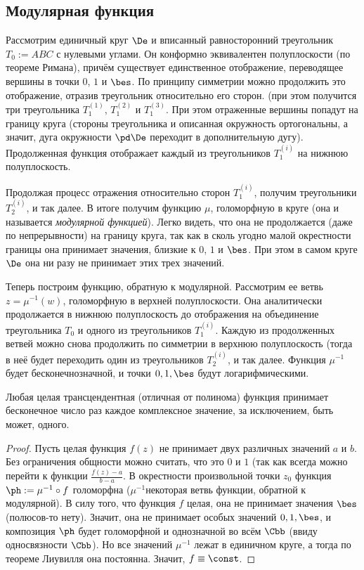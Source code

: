 \documentclass[a4paper]{article}
\begin{document}
\begin{theorem}
\subsection{Модулярная функция}

Рассмотрим единичный круг $\De$ и вписанный равносторонний треугольник $T_0 := ABC$ с нулевыми углами. Он конформно
эквивалентен полуплоскости (по теореме Римана), причём существует единственное отображение,  переводящее вершины
в точки $0$, $1$ и $\bes$. По принципу симметрии можно продолжить это отображение, отразив треугольник относительно
его сторон. (при этом получится три треугольника $T_1^{(1)}$, $T_1^{(2)}$ и $T_1^{(3)}$.
При этом отраженные вершины попадут на границу круга (стороны треугольника и описанная окружность ортогональны,
а значит, дуга окружности $\pd \De$ переходит в дополнительную дугу). Продолженная функция отображает каждый из
треугольников $T_1^{(i)}$ на нижнюю полуплоскость.

Продолжая процесс отражения относительно сторон $T_1^{(i)}$, получим треугольники $T_2^{(i)}$, и так далее.
В итоге получим функцию $\mu$, голоморфную в круге (она и называется \emph{модулярной функцией}). Легко видеть, что
она не продолжается (даже по непрерывности) на границу круга, так как в сколь угодно малой окрестности границы она
принимает значения, близкие к $0$, $1$ и $\bes$. При этом в самом круге $\De$ она ни разу не принимает этих трех значений.

Теперь построим  функцию, обратную к модулярной. Рассмотрим ее ветвь $z = \mu^{-1}(w)$, голоморфную в верхней полуплоскости.
Она аналитически продолжается в нижнюю полуплоскость до отображения на объединение треугольника $T_0$ и одного из
треугольников $T_1^{(i)}$. Каждую из продолженных ветвей можно снова продолжить по симметрии в верхнюю полуплоскость
(тогда в неё будет переходить один из треугольников $T_2^{(i)}$, и так далее. Функция $\mu^{-1}$ будет бесконечнозначной,
и точки $0,1,\bes$ будут логарифмическими.

\begin{theorem}
Любая целая трансцендентная ( отличная от полинома) функция принимает бесконечное число раз каждое
комплексное значение, за исключением, быть может, одного.
\end{theorem}
\begin{proof}
Пусть целая функция $f(z)$ не принимает двух различных значений $a$ и $b$. Без ограничения общности можно считать, что это $0$ и $1$
(так как всегда можно перейти к функции $\frac{f(z)-a}{b-a}$. В окрестности произвольной точки $z_0$ функция $\ph := \mu^{-1}\circ f$
голоморфна ($\mu^{-1}$\т некоторая ветвь функции, обратной к модулярной). В силу того, что функция $f$ целая, она  не принимает
значения $\bes$ (полюсов-то нету). Значит, она не принимает особых значений $0,1,\bes$, и композиция $\ph$ будет
голоморфной и однозначной во всём $\Cbb$ (ввиду односвязности $\Cbb$). Но все значений $\mu^{-1}$ лежат в единичном круге,
а тогда по теореме Лиувилля она постоянна. Значит, $f\equiv\const$.
\end{proof}


\end{theorem}
\end{document}
